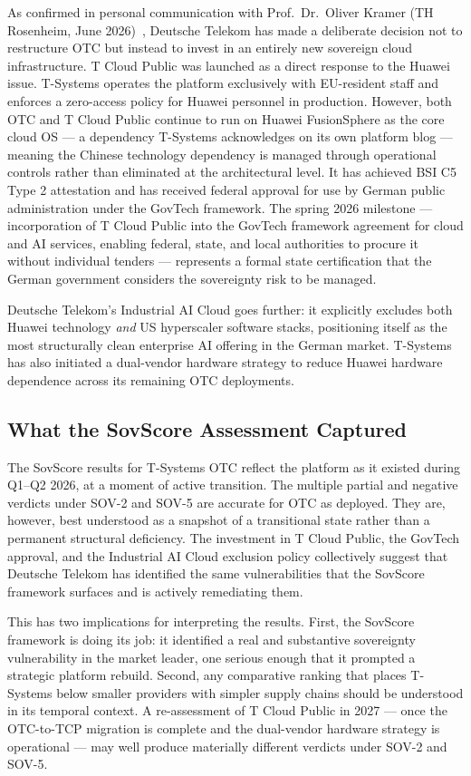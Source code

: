 As confirmed in personal communication with Prof.~Dr.~Oliver Kramer (TH Rosenheim, June 2026)~\cite{Kramer_PersonalComm_2026}, Deutsche Telekom has made a deliberate decision not to restructure OTC but instead to invest in an entirely new sovereign cloud infrastructure. T Cloud Public was launched as a direct response to the Huawei issue. T-Systems operates the platform exclusively with EU-resident staff and enforces a zero-access policy for Huawei personnel in production. However, both OTC and T Cloud Public continue to run on Huawei FusionSphere as the core cloud OS — a dependency T-Systems acknowledges on its own platform blog — meaning the Chinese technology dependency is managed through operational controls rather than eliminated at the architectural level. It has achieved BSI C5 Type 2 attestation and has received federal approval for use by German public administration under the GovTech framework. The spring 2026 milestone — incorporation of T Cloud Public into the GovTech framework agreement for cloud and AI services, enabling federal, state, and local authorities to procure it without individual tenders — represents a formal state certification that the German government considers the sovereignty risk to be managed.

Deutsche Telekom's Industrial AI Cloud goes further: it explicitly excludes both Huawei technology \emph{and} US hyperscaler software stacks, positioning itself as the most structurally clean enterprise AI offering in the German market. T-Systems has also initiated a dual-vendor hardware strategy to reduce Huawei hardware dependence across its remaining OTC deployments.

\subsection{What the SovScore Assessment Captured}

The SovScore results for T-Systems OTC reflect the platform as it existed during Q1--Q2 2026, at a moment of active transition. The multiple partial and negative verdicts under SOV-2 and SOV-5 are accurate for OTC as deployed. They are, however, best understood as a snapshot of a transitional state rather than a permanent structural deficiency. The investment in T Cloud Public, the GovTech approval, and the Industrial AI Cloud exclusion policy collectively suggest that Deutsche Telekom has identified the same vulnerabilities that the SovScore framework surfaces and is actively remediating them.

This has two implications for interpreting the results. First, the SovScore framework is doing its job: it identified a real and substantive sovereignty vulnerability in the market leader, one serious enough that it prompted a strategic platform rebuild. Second, any comparative ranking that places T-Systems below smaller providers with simpler supply chains should be understood in its temporal context. A re-assessment of T Cloud Public in 2027 — once the OTC-to-TCP migration is complete and the dual-vendor hardware strategy is operational — may well produce materially different verdicts under SOV-2 and SOV-5.

